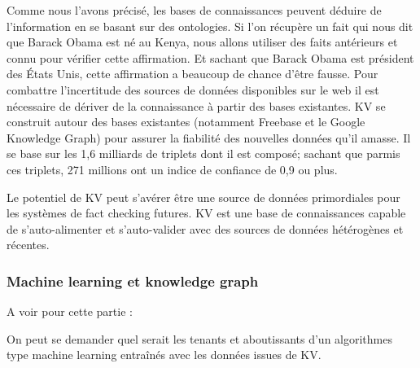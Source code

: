 Comme nous l'avons précisé, les bases de connaissances peuvent déduire de l'information en se basant sur des ontologies. Si l'on récupère un fait qui nous dit que Barack Obama est né au Kenya, nous allons utiliser des faits antérieurs et connu pour vérifier cette affirmation. Et sachant que Barack Obama est président des États Unis, cette affirmation a beaucoup de chance d'être fausse. Pour combattre l'incertitude des sources de données disponibles sur le web il est nécessaire de dériver de la connaissance à partir des bases existantes. KV se construit autour des bases existantes (notamment Freebase et le Google Knowledge Graph) pour assurer la fiabilité des nouvelles données qu'il amasse. Il se base sur les 1,6 milliards de triplets dont il est composé; sachant que parmis ces triplets, 271 millions ont un indice de confiance de 0,9 ou plus.

Le potentiel de KV peut s'avérer être une source de données primordiales pour les systèmes de fact checking futures. KV est une base de connaissances capable de s'auto-alimenter et s'auto-valider avec des sources de données hétérogènes et récentes. 

\subsubsection{Machine learning et knowledge graph}

A voir pour cette partie : \cite{nickel2016review} \cite{gerber2015}  \cite{wilcke2017knowledge}

On peut se demander quel serait les tenants et aboutissants d'un algorithmes type machine learning entraînés avec les données issues de KV.